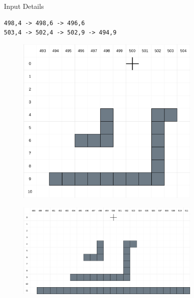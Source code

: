 \documentclass{beamer}
\begin{document}
\begin{frame}[fragile]{Input Details}
    \begin{verbatim}
498,4 -> 498,6 -> 496,6
503,4 -> 502,4 -> 502,9 -> 494,9
    \end{verbatim}
    \pause
    \begin{minipage}[c]{0.4\textwidth}
        \begin{figure}[H]
            \centering
            \includegraphics[width=0.8\textwidth]{Images/AoC22_14_00_grid.png}
        \end{figure}
    \end{minipage}%
    \begin{minipage}[c]{0.6\textwidth}
        \begin{figure}[H]
            \centering
            \includegraphics[width=0.8\textwidth]{Images/AoC22_14_Part_2_0_grid.png}
        \end{figure}
    \end{minipage}
\end{frame}
\end{document}
